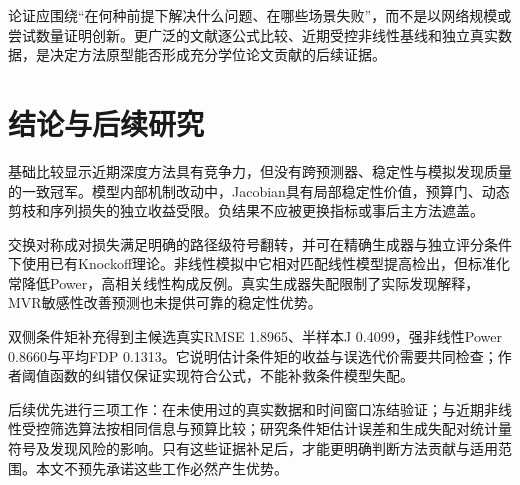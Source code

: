 \documentclass{sufethesismas}
\begin{document}
论证应围绕``在何种前提下解决什么问题、在哪些场景失败''，而不是以网络规模或尝试数量证明创新。更广泛的文献逐公式比较、近期受控非线性基线和独立真实数据，是决定方法原型能否形成充分学位论文贡献的后续证据。

\chapter{结论与后续研究}

基础比较显示近期深度方法具有竞争力，但没有跨预测器、稳定性与模拟发现质量的一致冠军。模型内部机制改动中，Jacobian具有局部稳定性价值，预算门、动态剪枝和序列损失的独立收益受限。负结果不应被更换指标或事后主方法遮盖。

交换对称成对损失满足明确的路径级符号翻转，并可在精确生成器与独立评分条件下使用已有Knockoff理论。非线性模拟中它相对匹配线性模型提高检出，但标准化常降低Power，高相关线性构成反例。真实生成器失配限制了实际发现解释，MVR敏感性改善预测也未提供可靠的稳定性优势。

双侧条件矩补充得到主候选真实RMSE 1.8965、半样本J 0.4099，强非线性Power 0.8660与平均FDP 0.1313。它说明估计条件矩的收益与误选代价需要共同检查；作者阈值函数的纠错仅保证实现符合公式，不能补救条件模型失配。

后续优先进行三项工作：在未使用过的真实数据和时间窗口冻结验证；与近期非线性受控筛选算法按相同信息与预算比较；研究条件矩估计误差和生成失配对统计量符号及发现风险的影响。只有这些证据补足后，才能更明确判断方法贡献与适用范围。本文不预先承诺这些工作必然产生优势。
\end{document}
